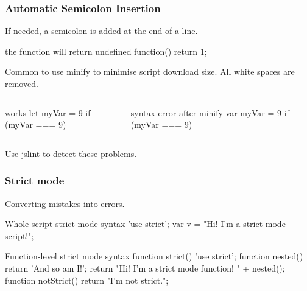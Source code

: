 \documentclass[aspectratio=1610]{beamer}
\begin{document}
\begin{frame}[fragile]
  \frametitle{Automatic Semicolon Insertion}
  If needed, a semicolon is added at the end of a line.
\begin{CodeBox}{the function will return undefined}
  function() { return
  1; }
\end{CodeBox}

\vspace{4mm}
Common to use minify to minimise script download size. All white spaces are removed.
\begin{columns}[onlytextwidth]
  \begin{column}{0.35\textwidth}
\begin{CodeBox}{works}
  let myVar = 9
  if (myVar === 9) {
  }
\end{CodeBox}
  \end{column}
  \begin{column}{0.65\textwidth}
\begin{CodeBox}{syntax error after minify}
  var myVar = 9 if (myVar === 9) {}
\end{CodeBox}
  \end{column}
  \begin{column}{0.3\textwidth}  \end{column}
\end{columns}%

\vspace{4mm}
Use jslint to detect these problems.
\end{frame}

\begin{frame}[fragile]
  \frametitle{Strict mode}
Converting mistakes into errors.

\begin{CodeBox}{Whole-script strict mode syntax}
'use strict';
var v = "Hi! I'm a strict mode script!";
\end{CodeBox}

\begin{CodeBox}{Function-level strict mode syntax}
function strict() {
  'use strict';
  function nested() { return 'And so am I!'; }
  return "Hi!  I'm a strict mode function!  " + nested();
}
function notStrict() { return "I'm not strict."; }
\end{CodeBox}


\end{frame}


\end{document}
